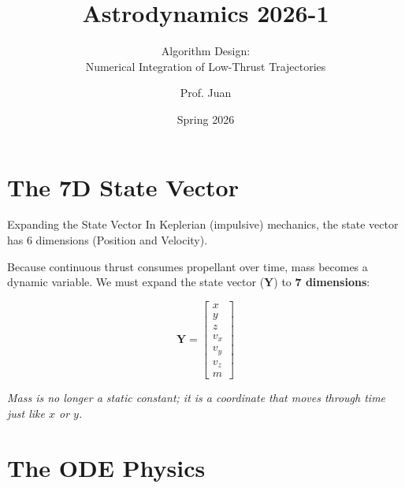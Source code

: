 \documentclass[11pt]{beamer}
\title[Numerical Integration]{Astrodynamics 2026-1}
\subtitle{Algorithm Design: \\ Numerical Integration of Low-Thrust Trajectories}
\author{Prof. Juan}
\institute{Universidad de Antioquia - Aerospace Engineering}
\date{Spring 2026}
\begin{document}
\begin{frame}
    \titlepage
\end{frame}

\section{The 7D State Vector}

\begin{frame}{Expanding the State Vector}
    In Keplerian (impulsive) mechanics, the state vector has 6 dimensions (Position and Velocity). 
    
    \vspace{0.3cm}
    Because continuous thrust consumes propellant over time, mass becomes a dynamic variable. We must expand the state vector ($\boldsymbol{Y}$) to \textbf{7 dimensions}:

    \begin{equation}
        \boldsymbol{Y} = 
        \begin{bmatrix}
            x \\ y \\ z \\ v_x \\ v_y \\ v_z \\ m
        \end{bmatrix}
    \end{equation}
    
    \vspace{0.3cm}
    \textit{Mass is no longer a static constant; it is a coordinate that moves through time just like $x$ or $y$.}
\end{frame}

\section{The ODE Physics}
\end{document}
